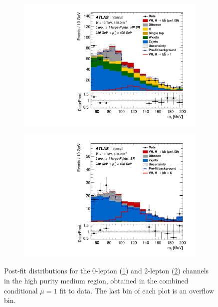 \begin{figure}[!htbp]
    \centering
    \begin{subfigure}{.5\textwidth}
      \centering
      \includegraphics[width=\textwidth]{chapters/6.vhbb_boosted/figs/Region_BMax400_BMin250_incFat1_Fat1_Y6051_DSRnoaddbjetsr_T2_L0_distmBB_J0_GlobalFit_conditionnal_mu1.pdf}
      \caption{}
      \label{fig:vhbb postfit plots sub1}
    \end{subfigure}%
    \begin{subfigure}{.5\textwidth}
      \centering
      \includegraphics[width=\textwidth]{chapters/6.vhbb_boosted/figs/Region_distmBB_J0_L2_T2_DSR_Y6051_incJet1_Fat1_incFat1_BMin250_BMax400_GlobalFit_conditionnal_mu1.pdf}
      \caption{}
      \label{fig:vhbb postfit plots sub2}
    \end{subfigure}
    \vspace{-0.5em}
    \caption{Post-fit distributions for the 0-lepton (\cref{fig:vhbb postfit plots sub1}) and 2-lepton (\cref{fig:vhbb postfit plots sub2}) channels in the high purity medium \pTV region, obtained in the combined conditional $\mu=1$ fit to data. The last bin of each plot is an overflow bin.}
    \label{fig:vhbb postfit plots}
\end{figure}
%

